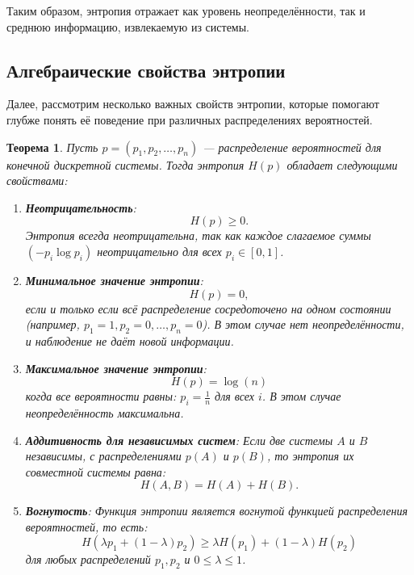 \documentclass[12pt,a4paper]{article}
\newtheorem{theorem}{Теорема}[section]
\newenvironment{thmbox}[1][]{%
  \begin{tcolorbox}[enhanced, breakable, colback=thmcolor, colframe=blue!50!black, title=#1, fonttitle=\bfseries, arc=3pt, boxrule=0.5pt]
}{\end{tcolorbox}}
\begin{document}
Таким образом, энтропия отражает как уровень неопределённости, так и среднюю информацию, извлекаемую из системы.

\subsection{Алгебраические свойства энтропии}

Далее, рассмотрим несколько важных свойств энтропии, которые помогают глубже понять её поведение при различных распределениях вероятностей.

\begin{thmbox}[Свойства энтропии]
\begin{theorem}
Пусть $p = (p_1, p_2, \dots, p_n)$ — распределение вероятностей для конечной дискретной системы. Тогда энтропия $H(p)$ обладает следующими свойствами:
\begin{enumerate}
    \item \textbf{Неотрицательность}:
    \[
    H(p) \geq 0.
    \]
    Энтропия всегда неотрицательна, так как каждое слагаемое суммы $\left(-p_i \log p_i\right)$ неотрицательно для всех $p_i \in [0,1]$.
    
    \item \textbf{Минимальное значение энтропии}:
    \[
    H(p) = 0,
    \]
    если и только если всё распределение сосредоточено на одном состоянии (например, $p_1=1, p_2=0, \dots, p_n=0$). В этом случае нет неопределённости, и наблюдение не даёт новой информации.
    
    \item \textbf{Максимальное значение энтропии}:
    \[
    H(p) = \log(n)
    \]
    когда все вероятности равны: $p_i = \frac{1}{n}$ для всех $i$. В этом случае неопределённость максимальна.
    
    \item \textbf{Аддитивность для независимых систем}:
    Если две системы $A$ и $B$ независимы, с распределениями $p(A)$ и $p(B)$, то энтропия их совместной системы равна:
    \[
    H(A, B) = H(A) + H(B).
    \]
    \item \textbf{Вогнутость}:
    Функция энтропии является вогнутой функцией распределения вероятностей, то есть:
    \[
    H(\lambda p_1 + (1-\lambda) p_2) \geq \lambda H(p_1) + (1 - \lambda) H(p_2)
    \]
    для любых распределений $p_1, p_2$ и $0 \leq \lambda \leq 1$.
\end{enumerate}
\end{theorem}
\end{thmbox}
\end{document}
